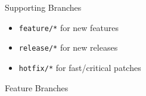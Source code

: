 \documentclass[
14pt,
aspectratio=169,
usenames,
dvipsnames,
x11names]{beamer}
\begin{document}
\begin{frame}{Supporting Branches}
  \begin{itemize} \setlength{\itemsep}{\fill}
  \item \alert{\texttt{feature/*}} for new features
  \item \alert{\texttt{release/*}} for new releases
  \item \alert{\texttt{hotfix/*}} for fast/critical patches
  \end{itemize}
\end{frame}

\begin{frame}{Feature Branches}
  \begin{columns}
    \begin{column}{.25\linewidth}
      \centering

\end{column}
\end{columns}
\end{frame}
\end{document}
